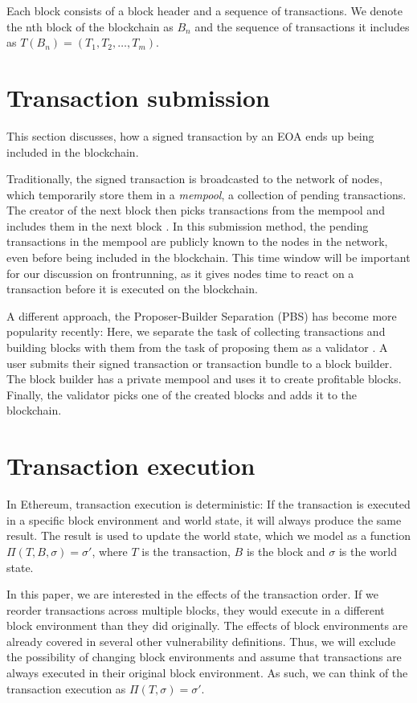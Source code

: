 \documentclass[draft,final]{vutinfth} %
\begin{document}
Each block consists of a block header and a sequence of transactions. We denote the nth block of the blockchain as $B_n$ and the sequence of transactions it includes as $T(B_n) = (T_1, T_2, \dots, T_m)$.

\section{Transaction submission}

This section discusses, how a signed transaction by an EOA ends up being included in the blockchain.

Traditionally, the signed transaction is broadcasted to the network of nodes, which temporarily store them in a \emph{mempool}, a collection of pending transactions. The creator of the next block then picks transactions from the mempool and includes them in the next block \cite{eskandari_sok_2020}. In this submission method, the pending transactions in the mempool are publicly known to the nodes in the network, even before being included in the blockchain. This time window will be important for our discussion on frontrunning, as it gives nodes time to react on a transaction before it is executed on the blockchain.

A different approach, the Proposer-Builder Separation (PBS) has become more popularity recently: Here, we separate the task of collecting transactions and building blocks with them from the task of proposing them as a validator \cite{heimbach_ethereums_2023}. A user submits their signed transaction or transaction bundle to a block builder. The block builder has a private mempool and uses it to create profitable blocks. Finally, the validator picks one of the created blocks and adds it to the blockchain.

\section{Transaction execution}

In Ethereum, transaction execution is deterministic: If the transaction is executed in a specific block environment and world state, it will always produce the same result. The result is used to update the world state, which we model as a function $\Pi(T, B, \sigma) = \sigma\prime$, where $T$ is the transaction, $B$ is the block and $\sigma$ is the world state.

In this paper, we are interested in the effects of the transaction order. If we reorder transactions across multiple blocks, they would execute in a different block environment than they did originally. The effects of block environments are already covered in several other vulnerability definitions. Thus, we will exclude the possibility of changing block environments and assume that transactions are always executed in their original block environment. As such, we can think of the transaction execution as $\Pi(T, \sigma) = \sigma\prime$.
\end{document}
